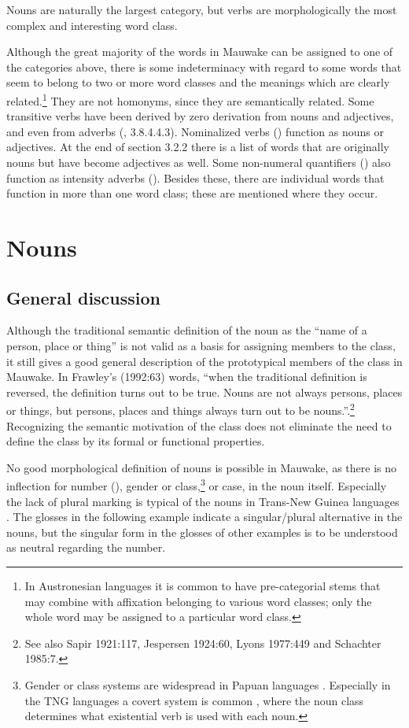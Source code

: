Nouns are naturally the largest category, but verbs are morphologically the most complex and interesting word class.

Although the great majority of the words in Mauwake can be assigned to one of the categories above, there is some indeterminacy with regard to some words that seem to belong to two or more word classes and the meanings which are clearly related.\footnote{In Austronesian languages it is common to have pre-categorial stems that may combine with affixation belonging to various word classes; only the whole word may be assigned to a particular word class.} They are not homonyms, since they are semantically related. Some transitive verbs have been derived by zero derivation from nouns and adjectives, and even from adverbs (, 3.8.4.4.3). Nominalized verbs () function as nouns or adjectives. At the end of section 3.2.2 there is a list of words that are originally nouns but have become adjectives as well. Some non-numeral quantifiers () also function as intensity adverbs (). Besides these, there are individual words that function in more than one word class; these are mentioned where they occur.

\section{Nouns}
{}
\subsection{General discussion}
{}
Although the traditional semantic definition of the noun as the ``name of a person, place or thing'' is not valid as a basis for assigning members to the class, it still gives a good general description of the prototypical members of the class in Mauwake. In Frawley's (1992:63) words, ``when the traditional definition is reversed, the definition turns out to be true. Nouns are not always persons, places or things, but persons, places and things always turn out to be nouns.''.\footnote{See also {Sapir 1921:117}, Jespersen 1924:60, Lyons 1977:449 and Schachter 1985:7.} Recognizing the semantic motivation of the class does not eliminate the need to define the class by its formal or functional properties.

No good morphological definition of nouns is possible in Mauwake, as there is no inflection for number (), gender or class,\footnote{Gender or class systems are widespread in Papuan languages \citep[77]{Foley1986}. Especially in the TNG languages a covert system is common \citep[58]{Wurm1982}, where the noun class determines what existential verb is used with each noun.} or case, in the noun itself. Especially the lack of plural marking is typical of the nouns in Trans-New Guinea languages \citep[36]{Wurm1982}. The glosses in the following example indicate a singular/plural alternative in the nouns, but the singular form in the glosses of other examples is to be understood as neutral regarding the number. 

